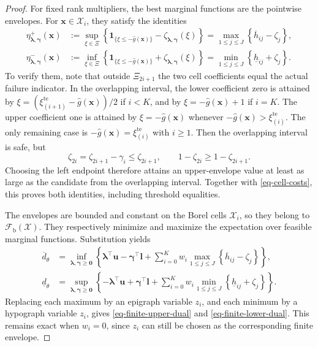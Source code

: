 \documentclass[review,11pt,3p,authoryear,nopreprintline]{elsarticle}
\begin{document}
\begin{proof}
  For fixed rank multipliers, the best marginal functions are the pointwise envelopes. For $\bm x\in\mathcal X_i$, they satisfy the identities
  \begin{equation}
    \begin{aligned}
      \eta^+_{\bm\lambda,\bm\gamma}(\bm x)
        &:=\sup_{\xi\in\Xi}\left\{\mathbf1_{\{\xi\le-\hat g(\bm x)\}}
          -\zeta_{\bm\lambda,\bm\gamma}(\xi)\right\}
          =\max_{1\le j\le J}\left\{\overline h_{ij}-\zeta_j\right\},\\
      \eta^-_{\bm\lambda,\bm\gamma}(\bm x)
        &:=\inf_{\xi\in\Xi}\left\{\mathbf1_{\{\xi\le-\hat g(\bm x)\}}
          +\zeta_{\bm\lambda,\bm\gamma}(\xi)\right\}
          =\min_{1\le j\le J}\left\{\underline h_{ij}+\zeta_j\right\}.
    \end{aligned}
    \label{eq-dual-envelope-identities}
  \end{equation}
  To verify them, note that outside $\Xi_{2i+1}$ the two cell coefficients equal the actual failure indicator. In the overlapping interval, the lower coefficient zero is attained by $\xi=\left(\xi_{(i+1)}^{\mathrm{te}}-\hat g(\bm x)\right)/2$ if $i<K$, and by $\xi=-\hat g(\bm x)+1$ if $i=K$. The upper coefficient one is attained by $\xi=-\hat g(\bm x)$ whenever $-\hat g(\bm x)>\xi_{(i)}^{\mathrm{te}}$. The only remaining case is $-\hat g(\bm x)=\xi_{(i)}^{\mathrm{te}}$ with $i\ge1$. Then the overlapping interval is safe, but
  \[
    \zeta_{2i}=\zeta_{2i+1}-\gamma_i\le\zeta_{2i+1},
    \qquad
    1-\zeta_{2i}\ge1-\zeta_{2i+1}.
  \]
  Choosing the left endpoint therefore attains an upper-envelope value at least as large as the candidate from the overlapping interval. Together with \eqref{eq-cell-costs}, this proves both identities, including threshold equalities.

  The envelopes are bounded and constant on the Borel cells $\mathcal X_i$, so they belong to $\mathcal F_{\mathrm b}(\mathcal X)$. They respectively minimize and maximize the expectation over feasible marginal functions. Substitution yields
  \begin{align}
    \overline d_\theta
      &=\inf_{\bm\lambda,\bm\gamma\ge\bm0}\left\{
        \bm\lambda^\top\bm u-\bm\gamma^\top\bm l
        +\sum_{i=0}^{K}w_i\max_{1\le j\le J}
          \left\{\overline h_{ij}-\zeta_j\right\}\right\},
      \label{eq-upper-measure-dual}\\
    \underline d_\theta
      &=\sup_{\bm\lambda,\bm\gamma\ge\bm0}\left\{
        -\bm\lambda^\top\bm u+\bm\gamma^\top\bm l
        +\sum_{i=0}^{K}w_i\min_{1\le j\le J}
          \left\{\underline h_{ij}+\zeta_j\right\}\right\}.
      \label{eq-lower-measure-dual}
  \end{align}
  Replacing each maximum by an epigraph variable $z_i$, and each minimum by a hypograph variable $z_i$, gives \eqref{eq-finite-upper-dual} and \eqref{eq-finite-lower-dual}. This remains exact when $w_i=0$, since $z_i$ can still be chosen as the corresponding finite envelope.


\end{proof}
\end{document}
